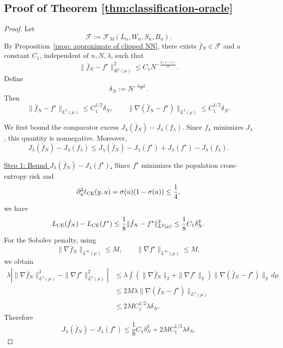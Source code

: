 \documentclass[11pt]{article}
\theoremstyle{plain}
\theoremstyle{definition}
\theoremstyle{remark}
\newcommand{\proofstep}[1]{\par\medskip\noindent\uline{#1}}
\begin{document}
\subsection{Proof of Theorem \ref{thm:classification-oracle}}\label{sec: proof of upper bound}
\begin{proof}
Let
\[
\mathcal F:=\mathcal F_M(L_n,W_n,S_n,B_n).
\]
By Proposition~\ref{prop: approximate of clipped NN}, there exists
\(\bar f_N\in\mathcal F\) and a constant \(C_1\), independent of
\(n,N,\lambda\), such that
\begin{equation}
\label{eq:fbarN-approx-fstar}
\|\bar f_N-f^\star\|_{H^1(\mu)}^2
\le
C_1
N^{-\frac{2(s-1)}{d}}.
\end{equation}
Define
\[
\delta_N:=N^{-\frac{s-1}{d}}.
\]
Then
\[
\|\bar f_N-f^\star\|_{L^2(\mu)}
\le C_1^{1/2}\delta_N,
\qquad
\|\nabla(\bar f_N-f^\star)\|_{L^2(\mu)}
\le C_1^{1/2}\delta_N.
\]

We first bound the comparator excess \(J_\lambda(\bar f_N)-J_\lambda(f_\lambda)\).
Since \(f_\lambda\) minimizes \(J_\lambda\), this quantity is nonnegative.
Moreover,
\[
J_\lambda(\bar f_N)-J_\lambda(f_\lambda)
\le
J_\lambda(\bar f_N)-J_\lambda(f^\star)
+
J_\lambda(f^\star)-J_\lambda(f_\lambda).
\]

\proofstep{Step 1: Bound \(J_\lambda(\bar f_N)-J_\lambda(f^\star)\).}
Since \(f^\star\) minimizes the population cross-entropy risk and
\[
\partial_u^2 \ell_{\rm CE}(y,u)
=
\sigma(u)(1-\sigma(u))
\le \frac14,
\]
we have
\[
L_{\rm CE}(\bar f_N)-L_{\rm CE}(f^\star)
\le
\frac18\|\bar f_N-f^\star\|_{L^2(\mu)}^2
\le
\frac18 C_1\delta_N^2.
\]
For the Sobolev penalty, using
\[
\|\nabla \bar f_N\|_{L^\infty(\mu)}\le M,
\qquad
\|\nabla f^\star\|_{L^\infty(\mu)}\le M,
\]
we obtain
\[
\begin{aligned}
\lambda
\left|
\|\nabla \bar f_N\|_{L^2(\mu)}^2
-
\|\nabla f^\star\|_{L^2(\mu)}^2
\right|
&\le
\lambda
\int
\left(
\|\nabla \bar f_N\|_2+\|\nabla f^\star\|_2
\right)
\|\nabla(\bar f_N-f^\star)\|_2\,d\mu\\
&\le
2M\lambda
\|\nabla(\bar f_N-f^\star)\|_{L^2(\mu)}\\
&\le
2M C_1^{1/2}\lambda\delta_N.
\end{aligned}
\]
Therefore
\begin{equation}
\label{eq:J-fbarN-minus-fstar}
J_\lambda(\bar f_N)-J_\lambda(f^\star)
\le
\frac18 C_1\delta_N^2
+
2M C_1^{1/2}\lambda\delta_N.
\end{equation}


\end{proof}
\end{document}
